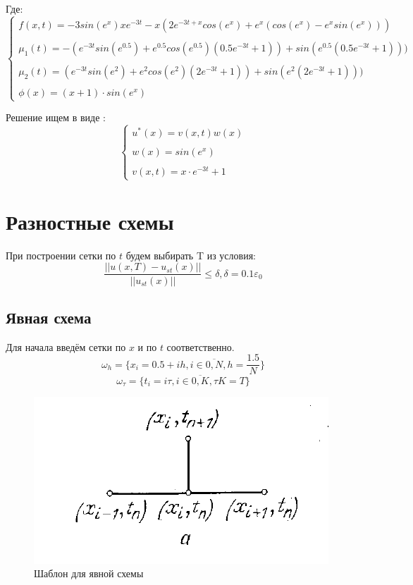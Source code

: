 \documentclass[12pt]{article}
\begin{document}
Где:
$$
\begin{cases}
f(x, t) = -3sin(e^x)xe^{-3t} - x(2e^{-3t+x}cos(e^x)+e^x(cos(e^x) - e^xsin(e^x)))  \\  \\ 
\mu_1(t) = -(e^{-3t}sin(e^{0.5}) + e^{0.5}cos(e^{0.5})(0.5e^{-3t}+1))+sin(e^{0.5}(0.5e^{-3t}+1)))\\ \\
\mu_2(t) = (e^{-3t}sin(e^{2}) + e^{2}cos(e^{2})(2e^{-3t}+1))+sin(e^{2}(2e^{-3t}+1))) \\ \\
\phi(x) = (x+1)\cdot sin(e^x)
\end{cases}
$$

Решение ищем в виде : 
$$
\begin{cases}
u^*(x) = v(x, t)w(x) \\ \\
w(x) = sin(e^x) \\ \\
v(x, t) = x\cdot e^{-3t}+1
\end{cases}
$$ 


\section{Разностные схемы}
При построении сетки по $t$ будем выбирать T из условия:
$$
\dfrac{||u(x, T) - u_{st}(x)||}{||u_{st}(x)||} \leq \delta, \delta = 0.1 \varepsilon_0
$$
\subsection{Явная схема}
Для начала введём сетки по $x$ и по $t$ соответственно.
$$
\omega_h = \{x_i = 0.5 + ih, i \in \overline{0,N}, h = \dfrac{1.5}{N}\} 
$$
$$
\omega_\tau = \{t_i = i\tau, i \in \overline{0,K}, \tau K = T \} 
$$

\begin{figure}[h]
\begin{center}
\includegraphics[scale = 0.8]{exp.png} 
\end{center}
\caption{Шаблон для явной схемы}
\end{figure}
\end{document}
